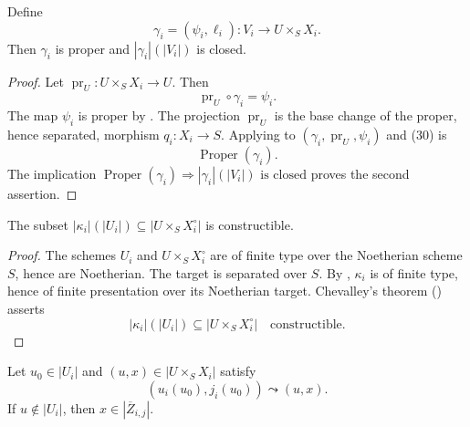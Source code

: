 \begin{lemma}
  \label{lemma:nagata-proper-extension-graph-closed}
  \lean{}

  Define
  \[
    \gamma_i=(\psi_i,\ell_i)\colon V_i\to U\times_SX_i.
  \]
  Then $\gamma_i$ is proper and $|\gamma_i|(|V_i|)$ is closed.
\end{lemma}

\begin{proof}
  Let $\operatorname{pr}_U\colon U\times_SX_i\to U$.  Then
  \[
    \operatorname{pr}_U\circ\gamma_i=\psi_i.                       \tag{30}
  \]
  The map $\psi_i$ is proper by
  .  The projection
  $\operatorname{pr}_U$ is the base change of the proper, hence separated,
  morphism $q_i\colon X_i\to S$.  Applying
   to
  $(\gamma_i,\operatorname{pr}_U,\psi_i)$ and (30) is
  \[
    \operatorname{Proper}(\gamma_i).
  \]
  The implication
  $\operatorname{Proper}(\gamma_i)\Rightarrow
    |\gamma_i|(|V_i|)\text{ is closed}$
  proves the second assertion.
\end{proof}

\begin{lemma}
  \label{lemma:nagata-intermediate-overlap-constructible}
  \lean{}

  The subset $|\kappa_i|(|U_i|)\subseteq|U\times_SX_i^\circ|$ is constructible.
\end{lemma}

\begin{proof}
  The schemes $U_i$ and $U\times_SX_i^\circ$ are of finite type over the
  Noetherian scheme $S$, hence are Noetherian.  The target is separated over
  $S$.  By ,
  $\kappa_i$ is of finite type, hence of finite presentation over its
  Noetherian target.  Chevalley's theorem
  (\cite[\href{https://stacks.math.columbia.edu/tag/054K}{Tag 054K}]
  {stacks-project}) asserts
  \[
    |\kappa_i|(|U_i|)\subseteq|U\times_SX_i^\circ|
    \quad\text{constructible}.
  \]
\end{proof}

\begin{lemma}
  \label{lemma:nagata-intermediate-specialization-boundary}
  \lean{}

  Let $u_0\in|U_i|$ and $(u,x)\in|U\times_SX_i|$ satisfy
  \[
    (u_i(u_0),j_i(u_0))\leadsto(u,x).
  \]
  If $u\notin|U_i|$, then $x\in|\overline Z_{i,j}|$.
\end{lemma}

